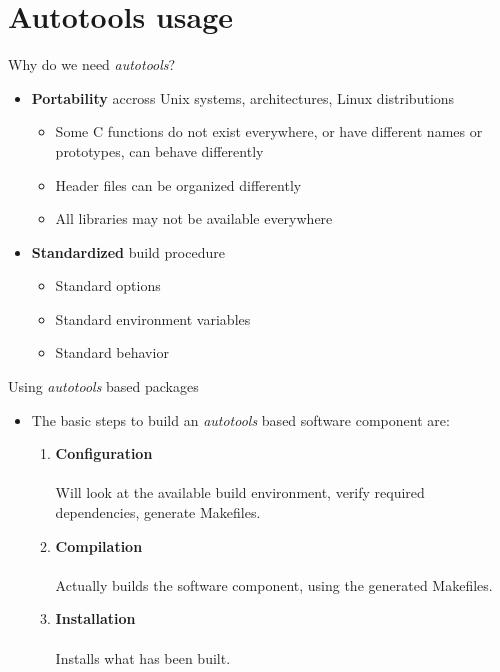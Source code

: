 \section{Autotools usage}

\begin{frame}{Why do we need {\em autotools}?}
  \begin{itemize}
  \item {\bf Portability} accross Unix systems, architectures, Linux
    distributions
    \begin{itemize}
    \item Some C functions do not exist everywhere, or have different
      names or prototypes, can behave differently
    \item Header files can be organized differently
    \item All libraries may not be available everywhere
    \end{itemize}
  \item {\bf Standardized} build procedure
    \begin{itemize}
    \item Standard options
    \item Standard environment variables
    \item Standard behavior
    \end{itemize}
  \end{itemize}
\end{frame}

\begin{frame}{Using {\em autotools} based packages}
  \begin{itemize}
  \item The basic steps to build an {\em autotools} based software
    component are:
    \begin{enumerate}
    \item {\bf Configuration}\\
      \\
      Will look at the available build environment, verify required
      dependencies, generate Makefiles.
    \item {\bf Compilation}\\
      \\
      Actually builds the software component, using the generated
      Makefiles.
    \item {\bf Installation}\\
      \\
      Installs what has been built.
    \end{enumerate}
  \end{itemize}
\end{frame}

